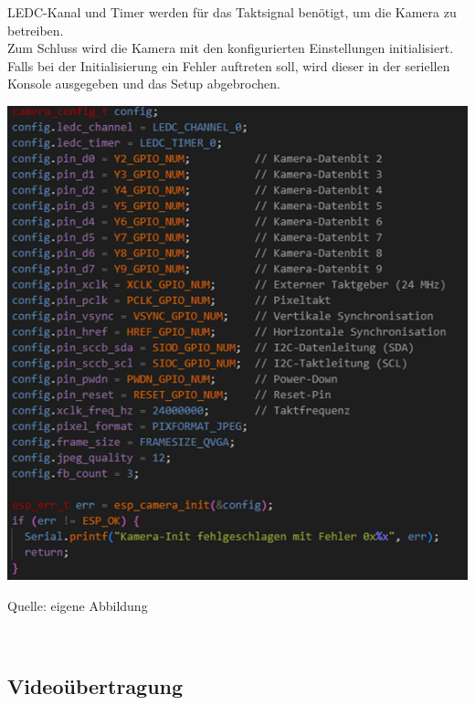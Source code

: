 \documentclass[ngerman,12pt,a4paper]{article}
\begin{document}
	LEDC-Kanal und Timer werden für das Taktsignal benötigt, um die Kamera zu betreiben. \\[0.5cm]
	Zum Schluss wird die Kamera mit den konfigurierten Einstellungen initialisiert. Falls bei der Initialisierung ein Fehler auftreten soll, wird dieser in der seriellen Konsole ausgegeben und das Setup abgebrochen.
	\begin{center}
		\begin{minipage}[t]{1\textwidth}
			\includegraphics{Pictures/kamera-setup2}
			\label{fig:Kamera-Initialisierung}
			\vspace{-10pt}
			\begin{center}
				\par\small Quelle: eigene Abbildung 
			\end{center}
		\end{minipage} \\[0.75cm]
	\end{center}
		
			\subsection{Videoübertragung}
		    \label{subsec:Videoübertragung}
			
\end{document}
